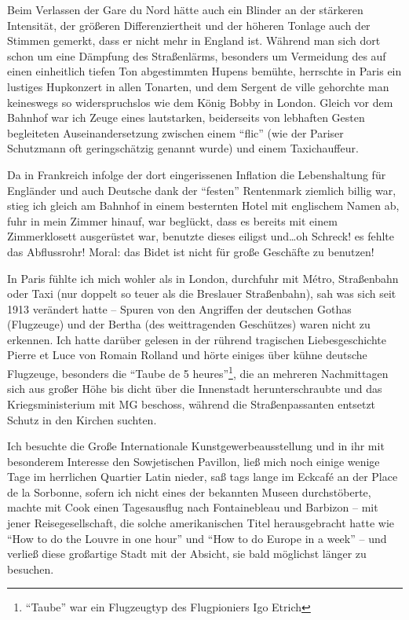 Beim Verlassen der Gare du Nord hätte auch ein Blinder an der stärkeren Intensität, der größeren Differenziertheit und der höheren Tonlage auch der Stimmen gemerkt, dass er nicht mehr in England ist. Während man sich dort schon um eine Dämpfung des Straßenlärms, besonders um Vermeidung des auf einen einheitlich tiefen Ton abgestimmten Hupens bemühte, herrschte in Paris ein lustiges Hupkonzert in allen Tonarten, und dem Sergent de ville gehorchte man keineswegs so widerspruchslos wie dem König Bobby in London. Gleich vor dem Bahnhof war ich Zeuge eines lautstarken, beiderseits von lebhaften Gesten begleiteten Auseinandersetzung zwischen einem \enquote{flic} (wie der Pariser Schutzmann oft geringschätzig genannt wurde) und einem Taxichauffeur.

Da in Frankreich infolge der dort eingerissenen Inflation die Lebenshaltung für Engländer und auch Deutsche dank der \enquote{festen} Rentenmark ziemlich billig war, stieg ich gleich am Bahnhof in einem besternten Hotel mit englischem Namen ab, fuhr in mein Zimmer hinauf, war beglückt, dass es bereits mit einem Zimmerklosett ausgerüstet war, benutzte dieses eiligst und\dots oh Schreck! es fehlte das Abflussrohr! Moral: das Bidet ist nicht für große Geschäfte zu benutzen!

In Paris fühlte ich mich wohler als in London, durchfuhr mit Métro, Straßenbahn oder Taxi (nur doppelt so teuer als die Breslauer Straßenbahn), sah was sich seit 1913 verändert hatte -- Spuren von den Angriffen der deutschen Gothas (Flugzeuge) und der Bertha (des weittragenden Geschützes) waren nicht zu erkennen. Ich hatte darüber gelesen in der rührend tragischen Liebesgeschichte Pierre et Luce von Romain Rolland und hörte einiges über kühne deutsche Flugzeuge, besonders die \enquote{Taube de 5 heures}\footnote{\enquote{Taube} war ein Flugzeugtyp des Flugpioniers Igo Etrich}, die an mehreren Nachmittagen sich aus großer Höhe bis dicht über die Innenstadt herunterschraubte und das Kriegsministerium mit MG beschoss, während die Straßenpassanten entsetzt Schutz in den Kirchen suchten.

Ich besuchte die Große Internationale Kunstgewerbeausstellung und in ihr mit besonderem Interesse den Sowjetischen Pavillon, ließ mich noch einige wenige Tage im herrlichen Quartier Latin nieder, saß tags lange im Eckcafé an der Place de la Sorbonne, sofern ich nicht eines der bekannten Museen durchstöberte, machte mit Cook einen Tagesausflug nach Fontainebleau und Barbizon -- mit jener Reisegesellschaft, die solche amerikanischen Titel herausgebracht hatte wie \enquote{How to do the Louvre in one hour} und \enquote{How to do Europe in a week} -- und verließ diese großartige Stadt mit der Absicht, sie bald möglichst länger zu besuchen.

